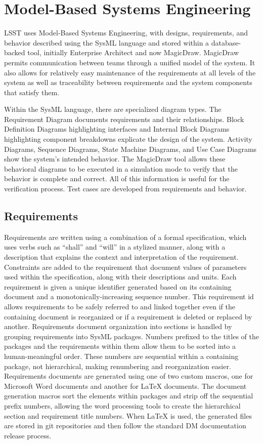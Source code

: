 \section{Model-Based Systems Engineering}

LSST uses Model-Based Systems Engineering\cite{2014SPIE.9150E..0MC}, with designs, requirements, and behavior described using the SysML language and stored within a database-backed tool, initially Enterprise Architect and now MagicDraw.
MagicDraw permits communication between teams through a unified model of the system.
It also allows for relatively easy maintenance of the requirements at all levels of the system as well as traceability between requirements and the system components that satisfy them.

Within the SysML language, there are specialized diagram types.
The Requirement Diagram documents requirements and their relationships.
Block Definition Diagrams highlighting interfaces and Internal Block Diagrams highlighting component breakdowns explicate the design of the system.
Activity Diagrams, Sequence Diagrams, State Machine Diagrams, and Use Case Diagrams show the system's intended behavior.
The MagicDraw tool allows these behavioral diagrams to be executed in a simulation mode to verify that the behavior is complete and correct.
All of this information is useful for the verification process.
Test cases are developed from requirements and behavior.

\subsection{Requirements}

Requirements are written using a combination of a formal specification, which uses verbs such as ``shall'' and ``will'' in a stylized manner, along with a description that explains the context and interpretation of the requirement.
Constraints are added to the requirement that document values of parameters used within the specification, along with their descriptions and units.
Each requirement is given a unique identifier generated based on its containing document and a monotonically-increasing sequence number.
This requirement id allows requirements to be safely referred to and linked together even if the containing document is reorganized or if a requirement is deleted or replaced by another.
Requirements document organization into sections is handled by grouping requirements into SysML packages.
Numbers prefixed to the titles of the packages and the requirements within them allow them to be sorted into a human-meaningful order.
These numbers are sequential within a containing package, not hierarchical, making renumbering and reorganization easier.
Requirements documents are generated using one of two custom macros, one for Microsoft Word documents and another for LaTeX documents.
The document generation macros sort the elements within packages and strip off the sequential prefix numbers, allowing the word processing tools to create the hierarchical section and requirement title numbers.
When LaTeX is used, the generated files are stored in git repositories and then follow the standard DM documentation release process.

